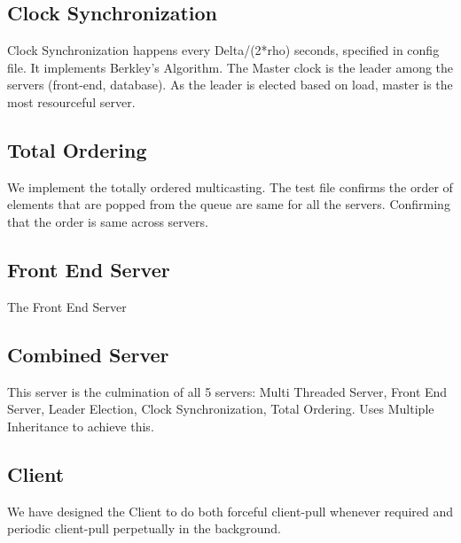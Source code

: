 \documentclass{article}
\begin{document}
\subsection{Clock Synchronization}
Clock Synchronization happens every Delta/(2*rho) seconds, specified in config file. It implements Berkley's Algorithm. The Master clock is the leader among the servers (front-end, database). As the leader is elected based on load, master is the most resourceful server.

\subsection{Total Ordering}
We implement the totally ordered multicasting. The test file confirms the order of elements that are popped from the queue are same for all the servers. Confirming that the order is same across servers.


\subsection{Front End Server}
The Front End Server 

\subsection{Combined Server}
This server is the culmination of all 5 servers: Multi Threaded Server, 
Front End Server, Leader Election, Clock Synchronization, Total Ordering.
Uses Multiple Inheritance to achieve this.

\subsection{Client}
We have designed the Client to do both forceful client-pull whenever required and periodic client-pull perpetually in the background.
\end{document}
